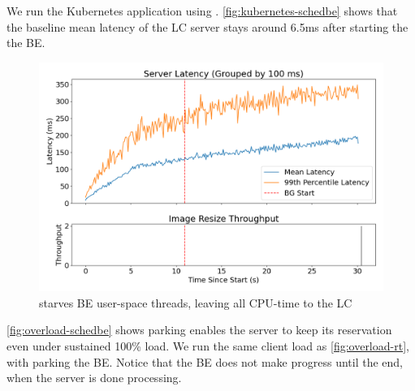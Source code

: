 We run the Kubernetes application using \beclass{}.
\autoref{fig:kubernetes-schedbe} shows that the baseline mean latency of the LC
server stays around 6.5ms after starting the the BE.

\begin{figure}[t]
    \centering
    \includegraphics[width=\columnwidth]{graphs/overload-schedbe.png}
    \caption{ \beclass{} starves BE user-space threads, leaving all CPU-time to
    the LC}\label{fig:overload-schedbe}
\end{figure}

\autoref{fig:overload-schedbe} shows parking enables the server to keep its
reservation even under sustained 100\% load. We run the same client load as
\autoref{fig:overload-rt}, with \beclass{} parking the BE. Notice that the BE
does not make progress until the end, when the server is done processing.
